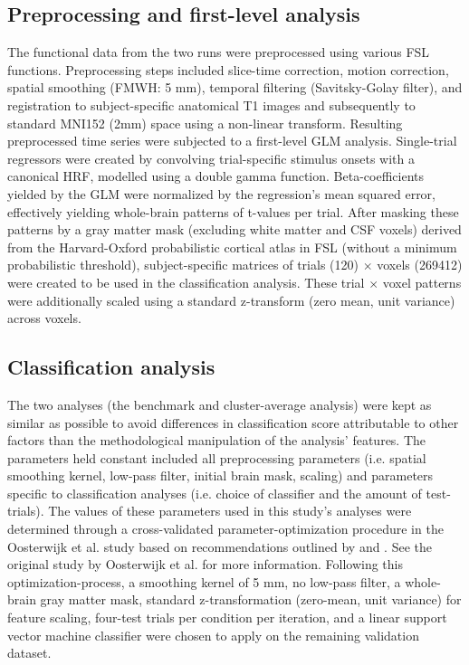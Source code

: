 \documentclass[jou,12pt,a4paper]{apa6}
\begin{document}
\subsection{Preprocessing and first-level analysis}
\noindent The functional data from the two runs were preprocessed using various FSL functions. Preprocessing steps included slice-time correction, motion correction, spatial smoothing (FMWH: 5 mm), temporal filtering (Savitsky-Golay filter), and registration to subject-specific anatomical T1 images and subsequently to standard MNI152 (2mm) space using a non-linear transform. Resulting preprocessed time series were subjected to a first-level GLM analysis. Single-trial regressors were created by convolving trial-specific stimulus onsets with a canonical HRF, modelled using a double gamma function. Beta-coefficients yielded by the GLM were normalized by the regression's mean squared error, effectively yielding whole-brain patterns of t-values per trial. After masking these patterns by a gray matter mask (excluding white matter and CSF voxels) derived from the Harvard-Oxford probabilistic cortical atlas in FSL (without a minimum probabilistic threshold), subject-specific matrices of trials (120) $\times$ voxels (269412) were created to be used in the classification analysis. These trial $\times$ voxel patterns were additionally scaled using a standard z-transform (zero mean, unit variance) across voxels. 

\subsection{Classification analysis}
\noindent The two analyses (the benchmark and cluster-average analysis) were kept as similar as possible to avoid differences in classification score attributable to other factors than the methodological manipulation of the analysis' features. The parameters held constant included all preprocessing parameters (i.e. spatial smoothing kernel, low-pass filter, initial brain mask, scaling) and parameters specific to classification analyses (i.e. choice of classifier and the amount of test-trials). The values of these parameters used in this study's analyses were determined through a cross-validated parameter-optimization procedure in the Oosterwijk et al. study based on recommendations outlined by  and . See the original study by Oosterwijk et al. for more information. Following this optimization-process, a smoothing kernel of 5 mm, no low-pass filter, a whole-brain gray matter mask, standard z-transformation (zero-mean, unit variance) for feature scaling, four-test trials per condition per iteration, and a linear support vector machine classifier were chosen to apply on the remaining validation dataset.
\end{document}
